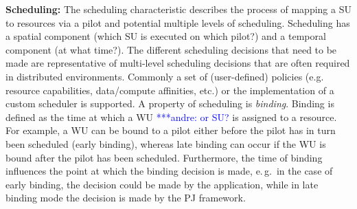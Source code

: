\documentclass[conference,final]{IEEEtran}
\newcommand{\alnote}[1]{ {\textcolor{blue} { ***andre: #1 }}}
\newcommand{\alnote}[1]{}
\begin{document}
\textbf{Scheduling:} The scheduling characteristic describes the process of
mapping a SU to resources via a pilot and potential multiple levels
of scheduling. Scheduling has a spatial
component (which SU is executed on which pilot?) and a temporal component (at
what time?). The different scheduling decisions that need to be made are
representative of multi-level scheduling decisions that are often required in
distributed environments. Commonly a set of (user-defined) policies (e.g.
resource capabilities, data/compute affinities, etc.) or the implementation of 
a custom scheduler is supported.
A property of scheduling is \emph{binding}. Binding is defined as the time at 
which a WU \alnote{or SU?} is assigned to a resource. For example, a WU can
be bound to a pilot either before the pilot has in turn been scheduled
(early binding), whereas late binding can occur if the WU is bound
after the pilot has been scheduled.  Furthermore, the time of binding
influences the point at which the binding decision is made, e.\,g.\ in
the case of early binding, the decision could be made by the
application, while in late binding mode the decision is made by
the PJ framework.





	
	
\end{document}
